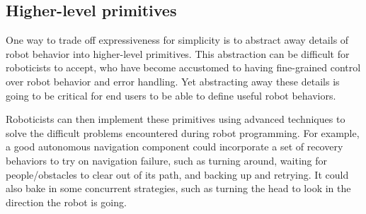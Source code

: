 \documentclass[10pt,twocolumn]{article}
\begin{document}

\subsection{Higher-level primitives}

One way to trade off expressiveness for simplicity is to abstract away details of robot behavior into higher-level primitives. This abstraction can be difficult for roboticists to accept, who have become accustomed to having fine-grained control over robot behavior and error handling. Yet abstracting away these details is going to be critical for end users to be able to define useful robot behaviors.


Roboticists can then implement these primitives using advanced techniques to solve the difficult problems encountered during robot programming.  For example, a good autonomous navigation component could incorporate a set of recovery behaviors to try on navigation failure, such as turning around, waiting for people/obstacles to clear out of its path, and backing up and retrying. It could also bake in some concurrent strategies, such as turning the head to look in the direction the robot is going. 

\end{document}
